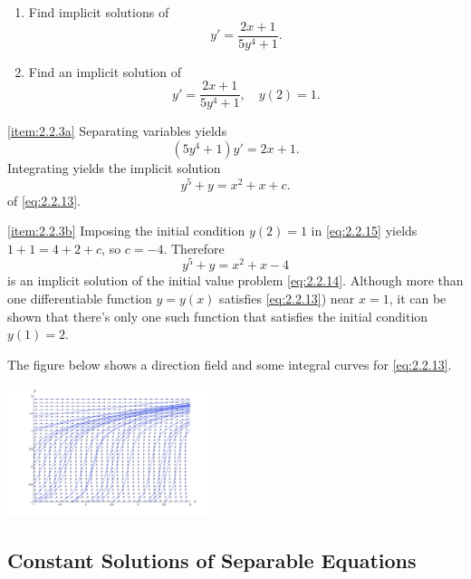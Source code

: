 \documentclass{ximera}
\begin{document}
\begin{example}\label{example:2.2.3}
\begin{enumerate}
\item\label{item:2.2.3a}
Find implicit solutions of
\begin{equation} \label{eq:2.2.13}
y'=\frac{2x+1}{5y^4+1}.
\end{equation}
\item\label{item:2.2.3b}
Find an implicit solution of
\begin{equation} \label{eq:2.2.14}
y'=\frac{2x+1}{5y^4+1},\quad y(2)=1.
\end{equation}
\end{enumerate}

\begin{explanation}
\ref{item:2.2.3a}
 Separating variables yields
$$
(5y^4+1)y'=2x+1.
$$
Integrating yields the implicit solution
\begin{equation} \label{eq:2.2.15}
y^5+y=x^2+x+ c.
\end{equation}
of \eqref{eq:2.2.13}.

\ref{item:2.2.3b} Imposing the initial condition $y(2)=1$ in
\eqref{eq:2.2.15} yields $1+1=4+2+c$, so $c=-4$. Therefore
$$
y^5+y=x^2+x-4
$$
is an implicit solution of the initial value problem \eqref{eq:2.2.14}.
Although more than one differentiable function $y=y(x)$ satisfies
\ref{eq:2.2.13}) near $x=1$, it can be shown that there's only
one such function that satisfies the initial condition $y(1)=2$.

The figure below shows a direction field and some integral curves
for \eqref{eq:2.2.13}.

\begin{image}
    \includegraphics[height=1.5in]{fig020202.jpg}
\end{image}

\end{explanation}
\end{example}

\subsection*{Constant Solutions of Separable Equations}
\end{document}
